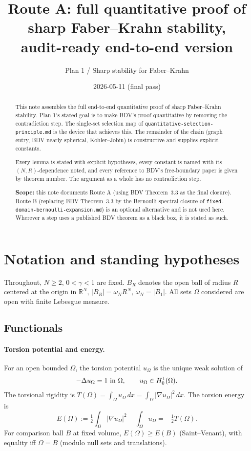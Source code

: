 \documentclass[11pt]{article}
\title{Route A: full quantitative proof of sharp Faber--Krahn stability,\\
audit-ready end-to-end version}
\author{Plan 1 / Sharp stability for Faber--Krahn}
\date{2026-05-11 (final pass)}
\theoremstyle{definition}
\newcommand{\R}{\mathbb{R}}
\newcommand{\abs}[1]{\left|#1\right|}
\renewcommand{\d}{\,d}
\begin{document}
\maketitle

\begin{abstract}
This note assembles the full end-to-end quantitative proof of sharp
Faber--Krahn stability. Plan 1's stated goal is to make BDV's proof
quantitative by removing the contradiction step. The single-set selection
map of \texttt{quantitative-selection-principle.md} is the device that
achieves this. The remainder of the chain (graph entry, BDV nearly
spherical, Kohler--Jobin) is constructive and supplies explicit constants.

Every lemma is stated with explicit hypotheses, every constant is named with
its $(N,R)$-dependence noted, and every reference to BDV's free-boundary
paper is given by theorem number. The argument as a whole has no
contradiction step.

\medskip
\noindent
\textbf{Scope:} this note documents Route A (using BDV Theorem~3.3 as the
final closure). Route B (replacing BDV Theorem~3.3 by the Bernoulli
spectral closure of \texttt{fixed-domain-bernoulli-expansion.md}) is an
optional alternative and is not used here. Wherever a step uses a published
BDV theorem as a black box, it is stated as such.
\end{abstract}

\tableofcontents

\section{Notation and standing hypotheses}\label{sec:notation}

Throughout, $N\ge2$, $0<\gamma<1$ are fixed. $B_R$ denotes the open ball
of radius $R$ centered at the origin in $\R^N$, $\abs{B_R}=\omega_NR^N$,
$\omega_N=\abs{B_1}$. All sets $\Omega$ considered are open with finite
Lebesgue measure.

\subsection{Functionals}

\paragraph{Torsion potential and energy.}
For an open bounded $\Omega$, the torsion potential $u_\Omega$ is the unique
weak solution of
\[
-\Delta u_\Omega=1\hbox{ in }\Omega,\qquad u_\Omega\in H^1_0(\Omega).
\]
The torsional rigidity is $T(\Omega)=\int_\Omega u_\Omega\d x
=\int_\Omega\abs{\nabla u_\Omega}^2\d x$. The torsion energy is
\[
E(\Omega):=\tfrac12\int_\Omega\abs{\nabla u_\Omega}^2-\int_\Omega u_\Omega
=-\tfrac12 T(\Omega).
\]
For comparison ball $B$ at fixed volume,
$E(\Omega)\ge E(B)$ (Saint--Venant), with equality iff $\Omega=B$
(modulo null sets and translations).
\end{document}
